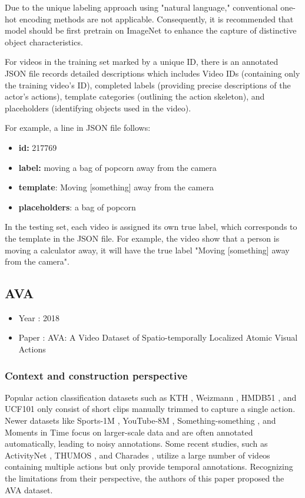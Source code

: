 \documentclass[10pt,onecolumn,letterpaper]{article}
\begin{document}
Due to the unique labeling approach using "natural language," conventional one-hot encoding methods are not applicable. Consequently, it is recommended that model should be first pretrain on ImageNet to enhance the capture of distinctive object characteristics.

For videos in the training set marked by a unique ID, there is an annotated JSON file records detailed descriptions which includes Video IDs (containing only the training video's ID), completed labels (providing precise descriptions of the actor's actions), template categories (outlining the action skeleton), and placeholders (identifying objects used in the video).

For example, a line in JSON file follows:
\begin{itemize}
\item \textbf{id:} 217769
\item \textbf{label:} moving a bag of popcorn away from the camera
\item \textbf{template}: Moving [something] away from the camera
\item \textbf{placeholders}: a bag of popcorn
\end{itemize}
In the testing set, each video is assigned its own true label, which corresponds to the template in the JSON file. For example, the video show that a person is moving a calculator away, it will have the true label "Moving [something] away from the camera".
\subsection{AVA}

\begin{itemize}
	\item Year : 2018
	\item Paper : AVA: A Video Dataset of Spatio-temporally Localized Atomic Visual
	Actions \cite{AVA}
\end{itemize}

\subsubsection{\textbf{Context and construction perspective}}

Popular action classification datasets such as KTH \cite{KTH}, Weizmann
\cite{Weizmann}, HMDB51 \cite{HMDB51}, and UCF101 \cite{UCF101} only consist of
short clips manually trimmed to capture a single action. Newer datasets like
Sports-1M \cite{Sports1M}, YouTube-8M \cite{YouTube8M}, Something-something
\cite{somethingsomething}, and Moments in Time \cite{momentsintime} focus on
larger-scale data and are often annotated automatically, leading to noisy
annotations. Some recent studies, such as ActivityNet \cite{ActivityNet}, THUMOS
\cite{THUMOS}, and Charades \cite{Charades}, utilize a large number of videos
containing multiple actions but only provide temporal annotations. Recognizing
the limitations from their perspective, the authors of this paper proposed the
AVA dataset.
\end{document}
